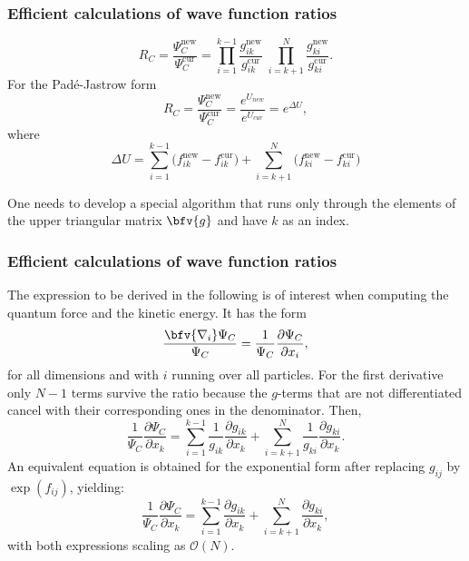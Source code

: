 \frame
 {
   \frametitle{Efficient calculations of wave function ratios}
 \begin{small}
 {\scriptsize
\begin{equation}\label{RjfRatio}
 \boxed{R_{C} = \frac{\Psi_{C}^\mathrm{new}}{\Psi_{C}^\mathrm{cur}} =
\prod_{i=1}^{k-1}\frac{g_{ik}^\mathrm{new}}{g_{ik}^\mathrm{cur}}\;
\prod_{i=k+1}^{N}\frac{g_{ki}^\mathrm{new}}{g_{ki}^\mathrm{cur}}}.
\end{equation}\label{padepadeRatio}
For the Pad\'e-Jastrow form
\begin{equation}
 \boxed{R_{C} = \frac{\Psi_{C}^\mathrm{new}}{\Psi_{C}^\mathrm{cur}} = \frac{e^{U_{new}}}{e^{U_{cur}}} = e^{\Delta U},}
\end{equation}
where
\begin{equation}
\Delta U =
\sum_{i=1}^{k-1}\big(f_{ik}^\mathrm{new}-f_{ik}^\mathrm{cur}\big)
+
\sum_{i=k+1}^{N}\big(f_{ki}^\mathrm{new}-f_{ki}^\mathrm{cur}\big)
\end{equation}

One needs to develop a special algorithm 
that runs only through the elements of the upper triangular
matrix $\bfv{g}$ and have $k$ as an index. 

 }
 \end{small}
 }


\frame
 {
   \frametitle{Efficient calculations of wave function ratios}
 \begin{small}
 {\scriptsize
The expression to be derived in the following is of interest when computing the quantum force and the kinetic energy. It has the form
$$
\frac{\bfv{{\nabla_i}}\Psi_C}{\Psi_C} = \frac{1}{\Psi_C}\frac{\partial \Psi_C}{\partial x_i},
$$
for all dimensions and with $i$ running over all particles.
For the first derivative only $N-1$ terms survive the ratio because the $g$-terms that are not differentiated cancel with their corresponding ones in the denominator. Then,
\begin{equation}\label{1jgradG}
\frac{1}{\Psi_C}\frac{\partial \Psi_C}{\partial x_k} =
\sum_{i=1}^{k-1}\frac{1}{g_{ik}}\frac{\partial g_{ik}}{\partial x_k}
+
\sum_{i=k+1}^{N}\frac{1}{g_{ki}}\frac{\partial g_{ki}}{\partial x_k}.
\end{equation}
An equivalent equation is obtained for the exponential form after replacing $g_{ij}$ by $\exp(f_{ij})$, yielding:
\begin{equation}\label{1jgradEG}
\frac{1}{\Psi_C}\frac{\partial \Psi_C}{\partial x_k} =
\sum_{i=1}^{k-1}\frac{\partial g_{ik}}{\partial x_k}
+
\sum_{i=k+1}^{N}\frac{\partial g_{ki}}{\partial x_k},
\end{equation}
with both expressions scaling as $\mathcal{O}(N)$.
 }
 \end{small}
 }


